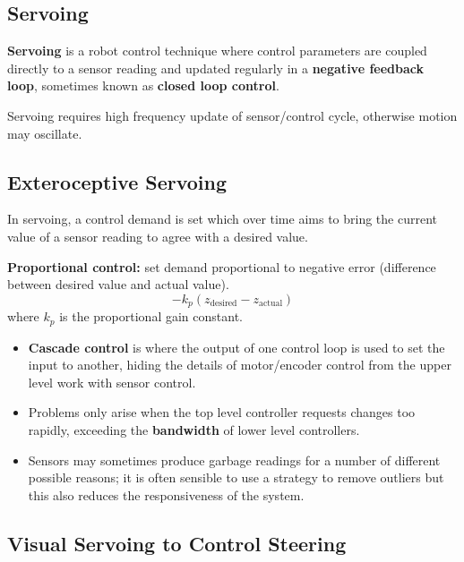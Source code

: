 \documentclass[11pt]{article}
\begin{document}
\subsection{Servoing}
\textbf{Servoing} is a robot control technique where control parameters are coupled directly to a sensor reading and updated regularly in a \textbf{negative feedback loop}, sometimes known as \textbf{closed loop control}.

Servoing requires high frequency update of sensor/control cycle, otherwise motion may oscillate.

\subsection{Exteroceptive Servoing}
In servoing, a control demand is set which over time aims to bring the current value of a sensor reading to agree with a desired value.

\textbf{Proportional control:} set demand proportional to negative error (difference between desired value and actual value).
\[
  -k_p(z_{\text{desired}} - z_{\text{actual}})
\]
where $k_p$ is the proportional gain constant.

\begin{itemize}
  \item \textbf{Cascade control} is where the output of one control loop is used to set the input to another, hiding the details of motor/encoder control from the upper level work with sensor control. 
  \item Problems only arise when the top level controller requests changes too rapidly, exceeding the \textbf{bandwidth} of lower level controllers.
  \item Sensors may sometimes produce garbage readings for a number of different possible reasons; it is often sensible to use a strategy to remove outliers but this also reduces the responsiveness of the system.
\end{itemize}

\subsection{Visual Servoing to Control Steering}
\end{document}
